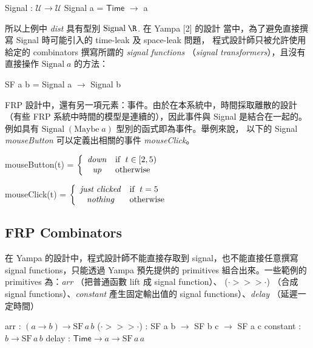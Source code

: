 \documentclass{article}
\newcommand{\Time}{\mathsf{Time}}
\newcommand{\U}{\mathcal{U}}
\begin{document}
  \begin{code}
  Signal : $\U\to\U$
  Signal a = $\Time$ $\to$ a
  \end{code}

  所以上例中 \textit{dist} 具有型別 $\text{Signal}\; \R$. 在 Yampa [2] 的設計
  當中，為了避免直接撰寫 Signal 時可能引入的 time-leak 及 space-leak 問題，
  程式設計師只被允許使用給定的 combinators 撰寫所謂的 \emph{signal functions}
  （\emph{signal transformers}），且沒有直接操作 $\text{Signal}\; a$ 的方法：

  \begin{code}
  SF a b = Signal a $\to$ Signal b
  \end{code}

  FRP 設計中，還有另一項元素：事件。由於在本系統中，時間採取離散的設計
  （有些 FRP 系統中時間的模型是連續的），因此事件與 Signal 是結合在一起的。
  例如具有 $\text{Signal}\;(\text{Maybe}\;a)$ 型別的函式即為事件。舉例來說，
  以下的 Signal \textit{mouseButton} 可以定義出相關的事件
  \textit{mouseClick}。

  \begin{code}
  mouseButton(t) = $\displaystyle \left\{ \begin{array}{cl} \mathit{down} & \text{if\; } t\in [2,5) \\ \mathit{up} & \text{otherwise} \end{array} \right.$

  mouseClick(t) = $\displaystyle \left\{ \begin{array}{cl} \mathit{just\; clicked} & \text{if\; } t=5 \\ \mathit{nothing} & \text{otherwise} \end{array} \right.$
  \end{code}


  \subsection{FRP Combinators}

  在 Yampa 的設計中，程式設計師不能直接存取到 signal，也不能直接任意撰寫
  signal functions，只能透過 Yampa 預先提供的 primitives 組合出來。一些範例的
  primitives 為：\textit{arr} （把普通函數 lift 成 signal function）、
  ($\cdot>\!\!>\!\!>\cdot$) （合成 signal functions）、\textit{constant}
  產生固定輸出值的 signal functions）、\textit{delay} （延遲一定時間）

  \begin{code}
  arr : $(a\to b)\to \text{SF}\,a\,b$
  ($\cdot>\!\!>\!\!>\cdot$) : SF a b $\to$ SF b c $\to$ SF a c
  constant : $b\to\text{SF}\,a\,b$
  delay : $\Time\to a\to\text{SF}\,a\,a$
  \end{code}
\end{document}
